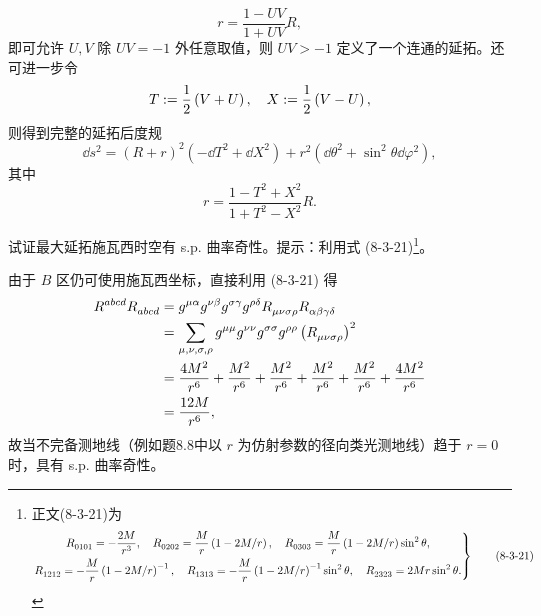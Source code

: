 \begin{xiti}
\begin{jie}
		\begin{equation*}
			r = \frac{1 - U V}{1 + U V} R,
		\end{equation*}
		即可允许 $U, V$ 除 $U V = - 1$ 外任意取值，则 $U V > -1$ 定义了一个连通的延拓。还可进一步令
		\begin{equation*}
			T := \frac{1}{2} \left( V + U \right) \qc X := \frac{1}{2} \left( V - U \right),
		\end{equation*}
		则得到完整的延拓后度规
		\begin{equation*}
			\dd s^2 = \left( R + r \right)^2 \left( - \dd{T}^2 + \dd{X}^2 \right) + r^2 \left( \dd \theta^2 + \sin^2 \theta \dd \varphi^2 \right),
		\end{equation*}
		其中
		\begin{equation*}
			r = \frac{1 - T^2 + X^2}{1 + T^2 - X^2} R.
		\end{equation*}
	\end{jie}

	\item 试证最大延拓施瓦西时空有 s.p. 曲率奇性。提示：利用式 (8-3-21)\footnote{正文(8-3-21)为
	\begin{equation}
		\left.
			\begin{gathered}
				\tensor{R}{_0_1_0_1} = -\frac{2M}{r^3} \qc \tensor{R}{_0_2_0_2} = \frac{M}{r} \left( 1 - 2M/r \right) \qc \tensor{R}{_0_3_0_3} = \frac{M}{r}\left( 1 - 2M/r \right) \sin^2\theta,\\
				\tensor{R}{_1_2_1_2} = - \frac{M}{r} \left( 1 - 2M/r \right)^{-1} \qc \tensor{R}{_1_3_1_3} = - \frac{M}{r} \left( 1 - 2M/r \right)^{-1} \sin^2 \theta \qc \tensor{R}{_2_3_2_3} = 2 M r \sin^2 \theta.
			\end{gathered}
		\right\}
		\tag{8-3-21}
	\end{equation}}。
	\begin{zm}
		由于 $B$ 区仍可使用施瓦西坐标，直接利用 (8-3-21) 得
		\begin{align*}
			\tensor{R}{^a^b^c^d} \tensor{R}{_a_b_c_d} &= \tensor{g}{^\mu^\alpha} \tensor{g}{^\nu^\beta} \tensor{g}{^\sigma^\gamma} \tensor{g}{^\rho^\delta} \tensor{R}{_\mu_\nu_\sigma_\rho} \tensor{R}{_\alpha_\beta_\gamma_\delta}\\
			&= \sum_{\mu,\nu,\sigma,\rho} \tensor{g}{^\mu^\mu} \tensor{g}{^\nu^\nu} \tensor{g}{^\sigma^\sigma} \tensor{g}{^\rho^\rho} \left( \tensor{R}{_\mu_\nu_\sigma_\rho} \right)^2\\
			&= \frac{4M^2}{r^6} + \frac{M^2}{r^6} + \frac{M^2}{r^6} + \frac{M^2}{r^6} + \frac{M^2}{r^6} + \frac{4M^2}{r^6}\\
			&= \frac{12 M}{r^6},
		\end{align*}
		故当不完备测地线（例如题8.8中以 $r$ 为仿射参数的径向类光测地线）趋于 $r=0$ 时，具有 s.p. 曲率奇性。
	\end{zm}


\end{xiti}
